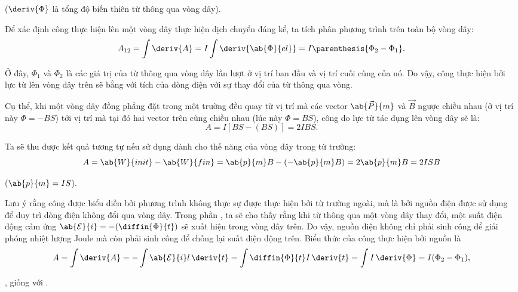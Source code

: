 \noindent
($\deriv{\Phi}$  là tổng độ biến thiên từ thông qua vòng dây).

Để xác định công thực hiện lên một vòng dây thực hiện dịch chuyển đáng kể, ta tích phân phương trình  trên toàn bộ vòng dây:
\begin{equation}\label{eq:6_94}
    A_{12} = \int \deriv{A} = I \int \deriv{\ab{\Phi}{el}} = I \parenthesis{\Phi_2 - \Phi_1}.
\end{equation}

\noindent
Ở đây, $\Phi_1$ và $\Phi_2$ là các giá trị của từ thông qua vòng dây lần lượt ở vị trí ban đầu và vị trí cuối cùng của nó. Do vậy, công thực hiện bởi lực từ lên vòng dây trên sẽ bằng với tích của dòng điện với sự thay đổi của từ thông qua vòng.

Cụ thể, khi một vòng dây đồng phẳng đặt trong một trường đều quay từ vị trí mà các vector $\ab{\vec{P}}{m}$ và $\vec{B}$ ngược chiều nhau (ở vị trí này $\Phi=-BS$) tới vị trí mà tại đó hai vector trên cùng chiều nhau (lúc này $\Phi=BS$), công do lực từ tác dụng lên vòng dây sẽ là:
\begin{equation*}
    A = I [BS - (BS)] = 2 I B S.
\end{equation*}

\noindent
Ta sẽ thu được kết quả tương tự nếu sử dụng  dành cho thế năng của vòng dây trong từ trường:
\begin{equation*}
    A = \ab{W}{init} - \ab{W}{fin} = \ab{p}{m} B - (- \ab{p}{m} B) = 2 \ab{p}{m} B = 2 I S B
\end{equation*}

\noindent
($\ab{p}{m}=IS$).

Lưu ý rằng công được biểu diễn bởi phương trình  không thực sự được thực hiện bởi từ trường ngoài, mà là bởi nguồn điện được sử dụng để duy trì dòng điện không đổi qua vòng dây. Trong phần , ta sẽ cho thấy rằng khi từ thông qua một vòng dây thay đổi, một suất điện động cảm ứng $\ab{\mathcal{E}}{i}=-(\diffin{\Phi}{t})$ sẽ xuất hiện trong vòng dây trên. Do vậy, nguồn điện không chỉ phải sinh công để giải phóng nhiệt lượng Joule mà còn phải sinh công để chống lại suất điện động trên. Biểu thức của công thực hiện bởi nguồn là 
\begin{equation*}
    A = \int \deriv{A} = -\int \ab{\mathcal{E}}{i} l\, \deriv{t} = \int \diffin{\Phi}{t} I\, \deriv{t} = \int I\, \deriv{\Phi} = I (\Phi_2 - \Phi_1),
\end{equation*}

\noindent
, giống với .

